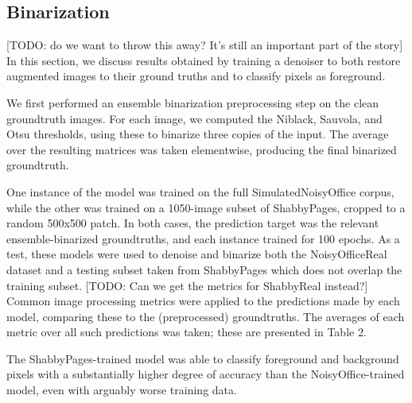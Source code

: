 \documentclass[runningheads]{llncs}
\begin{document}
\subsection{Binarization} [TODO: do we want to throw this away? It's still an important part of the story]
In this section, we discuss results obtained by training a denoiser to both restore augmented images to their ground truths and to classify pixels as foreground.

We first performed an ensemble binarization preprocessing step on the clean groundtruth images.
For each image, we computed the Niblack, Sauvola, and Otsu thresholds, using these to binarize three copies of the input. The average over the resulting matrices was taken elementwise, producing the final binarized groundtruth.

One instance of the model was trained on the full SimulatedNoisyOffice corpus, while the other was trained on a 1050-image subset of ShabbyPages, cropped to a random 500x500 patch. In both cases, the prediction target was the relevant ensemble-binarized groundtruths, and each instance trained for 100 epochs.
As a test, these models were used to denoise and binarize both the NoisyOfficeReal dataset and a testing subset taken from ShabbyPages which does not overlap the training subset. [TODO: Can we get the metrics for ShabbyReal instead?]
Common image processing metrics were applied to the predictions made by each model, comparing these to the (preprocessed) groundtruths.
The averages of each metric over all such predictions was taken; these are presented in Table 2.

\begin{table}[]
    \centering
    \caption{Document image *binarization* performance of a NAFNet model trained and tested on ShabbyPages and NoisyOffice.}
    \label{tab:binarization_results}
\end{table}

The ShabbyPages-trained model was able to classify foreground and background pixels with a substantially higher degree of accuracy than the NoisyOffice-trained model, even with arguably worse training data.
\end{document}
